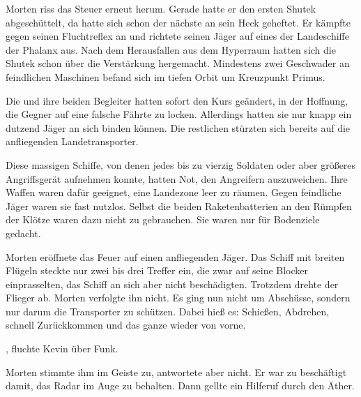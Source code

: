 Morten riss das Steuer erneut herum. Gerade hatte er den ersten Shutek abgeschüttelt, da hatte sich schon der nächste an sein Heck geheftet. Er kämpfte gegen seinen Fluchtreflex an und richtete seinen Jäger auf eines der Landeschiffe der Phalanx aus. Nach dem Herausfallen aus dem Hyperraum hatten sich die Shutek schon über die Verstärkung hergemacht. Mindestens zwei Geschwader an feindlichen Maschinen befand sich im tiefen Orbit um Kreuzpunkt Primus.

\par

Die  und ihre beiden Begleiter hatten sofort den Kurs geändert, in der Hoffnung, die Gegner auf eine falsche Fährte zu locken. Allerdings hatten sie nur knapp ein dutzend Jäger an sich binden können. Die restlichen stürzten sich bereits auf die anfliegenden Landetransporter.

\par

Diese massigen Schiffe, von denen jedes bis zu vierzig Soldaten oder aber größeres Angriffsgerät aufnehmen konnte, hatten Not, den Angreifern auszuweichen. Ihre Waffen waren dafür geeignet, eine Landezone leer zu räumen. Gegen feindliche Jäger waren sie fast nutzlos. Selbst die beiden Raketenbatterien an den Rümpfen der Klötze waren dazu nicht zu gebrauchen. Sie waren nur für Bodenziele gedacht.

\par

Morten eröffnete das Feuer auf einen anfliegenden Jäger. Das Schiff mit breiten Flügeln steckte nur zwei bis drei Treffer ein, die zwar auf seine Blocker einprasselten, das Schiff an sich aber nicht beschädigten. Trotzdem drehte der Flieger ab. Morten verfolgte ihn nicht. Es ging nun nicht um Abschüsse, sondern nur darum die Transporter zu schützen. Dabei hieß es: Schießen, Abdrehen, schnell Zurückkommen und das ganze wieder von vorne.

\par

, fluchte Kevin über Funk.

\par

Morten stimmte ihm im Geiste zu, antwortete aber nicht. Er war zu beschäftigt damit, das Radar im Auge zu behalten. Dann gellte ein Hilferuf durch den Äther. 

\par

